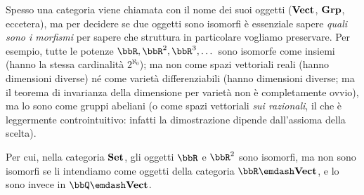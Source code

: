 \begin{warning}
	Spesso una categoria viene chiamata con il nome dei suoi oggetti (\(\mathbf{Vect}\), \(\mathbf{Grp}\), eccetera), ma per decidere se due oggetti sono isomorfi è essenziale sapere \emph{quali sono i morfismi} per sapere che struttura in particolare vogliamo preservare. Per esempio, tutte le potenze \(\bbR,\bbR^2,\bbR^3,\dots\) sono isomorfe come insiemi (hanno la stessa cardinalità \(2^{\aleph_0}\)); ma non come spazi vettoriali reali (hanno dimensioni diverse) né come varietà differenziabili (hanno dimensioni diverse; ma il teorema di invarianza della dimensione per varietà non è completamente ovvio), ma lo sono come gruppi abeliani (o come spazi vettoriali \emph{sui razionali}, il che è leggermente controintuitivo: infatti la dimostrazione dipende dall'assioma della scelta).

	Per cui, nella categoria \(\mathbf{Set}\), gli oggetti \(\bbR\) e \(\bbR^2\) sono isomorfi, ma non sono isomorfi se li intendiamo come oggetti della categoria \(\bbR\emdash\ctVect\), e lo sono invece in \(\bbQ\emdash\ctVect\).
\end{warning}

